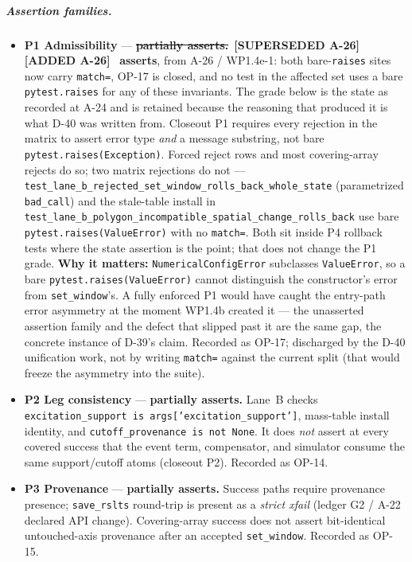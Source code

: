 \documentclass[
  10pt,
]{article}
\providecommand{\tightlist}{%
  \setlength{\itemsep}{0pt}\setlength{\parskip}{0pt}}
\newcommand{\amdstrike}[1]{\sout{#1}}
\newcommand{\amdstrike}[1]{\textcolor{supcolor}{#1}}
\newcommand{\amdnew}[1]{{\color{amdcolor}\footnotesize\textbf{[ADDED #1]}}\ }
\newcommand{\supsd}[2]{{\color{supcolor}\amdstrike{#2}}~{\color{amdcolor}\footnotesize\textbf{[SUPERSEDED #1]}}}
\begin{document}
\subparagraph{Assertion families.}
\begin{itemize}
\tightlist
\item \textbf{P1 Admissibility} --- \supsd{A-26}{\textbf{partially asserts.}} \amdnew{A-26} \textbf{asserts}, from A-26 / WP1.4e-1: both bare-\texttt{raises} sites now carry \texttt{match=}, OP-17 is closed, and no test in the affected set uses a bare \texttt{pytest.raises} for any of these invariants. The grade below is the state as recorded at A-24 and is retained because the reasoning that produced it is what D-40 was written from. Closeout P1 requires every rejection in the matrix to assert error type \emph{and} a message substring, not bare \texttt{pytest.raises(Exception)}. Forced reject rows and most covering-array rejects do so; two matrix rejections do not --- \texttt{test\_lane\_b\_rejected\_set\_window\_rolls\_back\_whole\_state} (parametrized \texttt{bad\_call}) and the stale-table install in \texttt{test\_lane\_b\_polygon\_incompatible\_spatial\_change\_rolls\_back} use bare \texttt{pytest.raises(ValueError)} with no \texttt{match=}. Both sit inside P4 rollback tests where the state assertion is the point; that does not change the P1 grade. \textbf{Why it matters:} \texttt{NumericalConfigError} subclasses \texttt{ValueError}, so a bare \texttt{pytest.raises(ValueError)} cannot distinguish the constructor's error from \texttt{set\_window}'s. A fully enforced P1 would have caught the entry-path error asymmetry at the moment WP1.4b created it --- the unasserted assertion family and the defect that slipped past it are the same gap, the concrete instance of D-39's claim. Recorded as OP-17; discharged by the D-40 unification work, not by writing \texttt{match=} against the current split (that would freeze the asymmetry into the suite).
\item \textbf{P2 Leg consistency} --- \textbf{partially asserts.} Lane~B checks \texttt{excitation\_support is args['excitation\_support']}, mass-table install identity, and \texttt{cutoff\_provenance is not None}. It does \emph{not} assert at every covered success that the event term, compensator, and simulator consume the same support/cutoff atoms (closeout P2). Recorded as OP-14.
\item \textbf{P3 Provenance} --- \textbf{partially asserts.} Success paths require provenance presence; \texttt{save\_rslts} round-trip is present as a \emph{strict xfail} (ledger G2 / A-22 declared API change). Covering-array success does not assert bit-identical untouched-axis provenance after an accepted \texttt{set\_window}. Recorded as OP-15.

\end{itemize}
\end{document}
